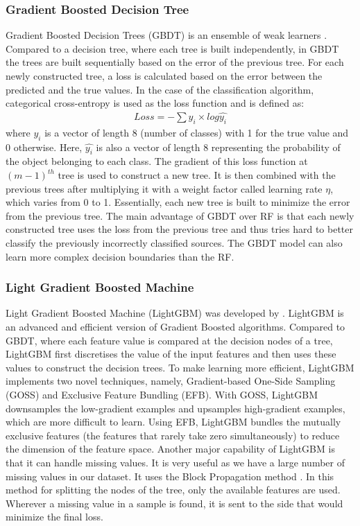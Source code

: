 \documentclass[fleqn,usenatbib]{mnras}
\begin{document}
        \subsubsection{Gradient Boosted Decision Tree}
         Gradient Boosted Decision Trees (GBDT) is an ensemble of weak learners \citep{friedman2001greedy}. Compared to a decision tree, where each tree is built independently, in GBDT the trees are built sequentially based on the error of the previous tree. For each newly constructed tree, a loss is calculated based on the error between the predicted and the true values. In the case of the classification algorithm, categorical cross-entropy is used as the loss function and is defined as: 
         \begin{align}
             Loss = -\sum y_i \times log \hat{y_i}
             \label{equ-loss}
         \end{align}
         where $y_i$ is a vector of length 8 (number of classes) with 1 for the true value and 0 otherwise. Here, $\hat{y_i}$ is also a vector of length 8 representing the probability of the object belonging to each class.
         The gradient of this loss function at $(m-1)^{th}$ tree is used to construct a new tree. It is then combined with the previous trees after multiplying it with a weight factor called learning rate $\eta$, which varies from 0 to 1. Essentially, each new tree is built to minimize the error from the previous tree. The main advantage of GBDT over RF is that each newly constructed tree uses the loss from the previous tree and thus tries hard to better classify the previously incorrectly classified sources. The GBDT model can also learn more complex decision boundaries than the RF.

        \subsubsection{Light Gradient Boosted Machine}
       Light Gradient Boosted Machine (LightGBM) was developed by \cite{ke2017lightgbm}. LightGBM is an advanced and efficient version of Gradient Boosted algorithms. Compared to GBDT, where each feature value is compared at the decision nodes of a tree, LightGBM first discretises the value of the input features and then uses these values to construct the decision trees. To make learning more efficient, LightGBM implements two novel techniques, namely, Gradient-based One-Side Sampling (GOSS) and Exclusive Feature Bundling (EFB). With GOSS, LightGBM downsamples the low-gradient examples and upsamples high-gradient examples, which are more difficult to learn. Using EFB, LightGBM bundles the mutually exclusive features (the features that rarely take zero simultaneously) to reduce the dimension of the feature space. Another major capability of LightGBM is that it can handle missing values. It is very useful as we have a large number of missing values in our dataset. It uses the Block Propagation method \citep{josse2019consistency}. In this method for splitting the nodes of the tree, only the available features are used. Wherever a missing value in a sample is found, it is sent to the side that would minimize the final loss.
       
\end{document}
